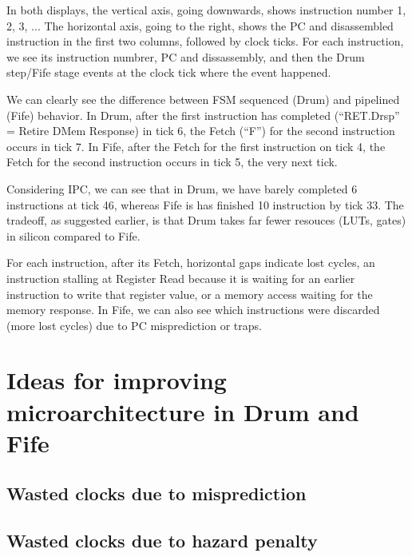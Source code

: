 In both displays, the vertical axis, going downwards, shows
instruction number 1, 2, 3, ...  The horizontal axis, going to the
right, shows the PC and disassembled instruction in the first two
columns, followed by clock ticks.  For each instruction, we see its
instruction numbrer, PC and dissassembly, and then the Drum step/Fife
stage events at the clock tick where the event happened.

We can clearly see the difference between FSM sequenced (Drum) and
pipelined (Fife) behavior.  In Drum, after the first instruction has
completed (``RET.Drsp'' = Retire DMem Response) in tick 6, the Fetch
(``F'') for the second instruction occurs in tick 7.  In Fife, after
the Fetch for the first instruction on tick 4, the Fetch for the
second instruction occurs in tick 5, the very next tick.

Considering IPC, we can see that in Drum, we have barely completed 6
instructions at tick 46, whereas Fife is has finished 10 instruction
by tick 33.  The tradeoff, as suggested earlier, is that Drum takes
far fewer resouces (LUTs, gates) in silicon compared to Fife.

For each instruction, after its Fetch, horizontal gaps indicate lost
cycles, {\eg} an instruction stalling at Register Read because it is
waiting for an earlier instruction to write that register value, or a
memory access waiting for the memory response.  In Fife, we can also
see which instructions were discarded (more lost cycles) due to PC
misprediction or traps.


\section{Ideas for improving microarchitecture in Drum and Fife}


\subsection{Wasted clocks due to misprediction}


\subsection{Wasted clocks due to hazard penalty}

